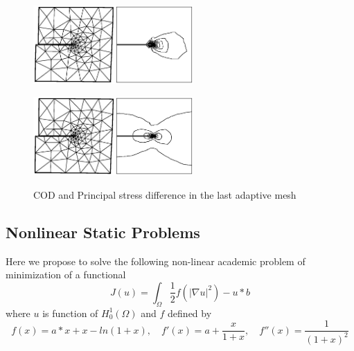 \documentclass[a4paper,twoside,12pt]{book}
\begin{document}
\begin{figure}[hbt]
\begin{multicols}{2}
\begin{center}
\includegraphics*[height=3cm]{1stCOD2}\includegraphics*[height=3cm]{1stPhoto2}
    \caption{\label{1stMode2} (COD) and Principal stress difference in the first mesh}
\end{center}
\begin{center}
\includegraphics*[height=3cm]{LastCOD2}\includegraphics*[height=3cm]{LastPhoto2}
    \caption{\label{LastMode2} COD and Principal stress difference in the last adaptive mesh}
\end{center}
\end{multicols}
\end{figure}


\subsection{Nonlinear Static Problems}
Here we propose to solve the following non-linear academic  problem of minimization
of a functional $$J(u) = \int_\Omega \frac{1}{2} f(|\nabla u|^2) - u*b $$
where $u$ is function of $H^1_0(\Omega)$
and $f$ defined by
$$
f(x) = a*x + x-ln(1+x), \quad f'(x) = a+\frac{x}{1+x}, \quad f''(x) =  \frac{1}{(1+x)^2}
$$
\end{document}
